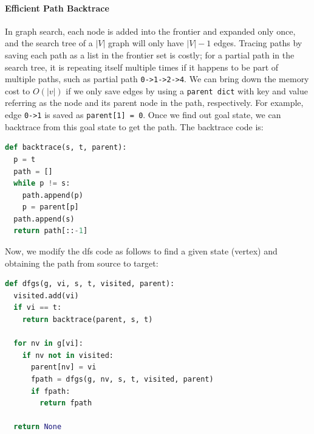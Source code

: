 \documentclass[../main.tex]{subfiles}
\begin{document}
\paragraph{Efficient Path Backtrace} In graph search, each node is added into the frontier and expanded only once, and the search tree of a $|V|$ graph will only have $|V|-1$ edges. Tracing paths by saving each path as a list in the frontier set is costly; for a partial path in the search tree, it is repeating itself multiple times if it happens to be part of multiple paths, such as partial path \texttt{0->1->2->4}. We can bring down the memory cost to $O(|v|)$ if we only save edges by using a \texttt{parent dict} with key and value referring as the node and its parent node in the path, respectively. For example, edge \texttt{0->1} is saved as \texttt{parent[1] = 0}. Once we find out goal state, we can backtrace from this goal state to get the path. The backtrace code is:
\begin{lstlisting}[language=Python]
def backtrace(s, t, parent):
  p = t
  path = []
  while p != s:
    path.append(p)
    p = parent[p]
  path.append(s)
  return path[::-1]
\end{lstlisting}
Now, we modify the dfs code as follows to find a given state (vertex) and obtaining the path from source to target:
\begin{lstlisting}[language=Python]
def dfgs(g, vi, s, t, visited, parent):  
  visited.add(vi) 
  if vi == t:
    return backtrace(parent, s, t)

  for nv in g[vi]:  
    if nv not in visited: 
      parent[nv] = vi
      fpath = dfgs(g, nv, s, t, visited, parent)
      if fpath:
        return fpath
  
  return None
\end{lstlisting}
\end{document}
